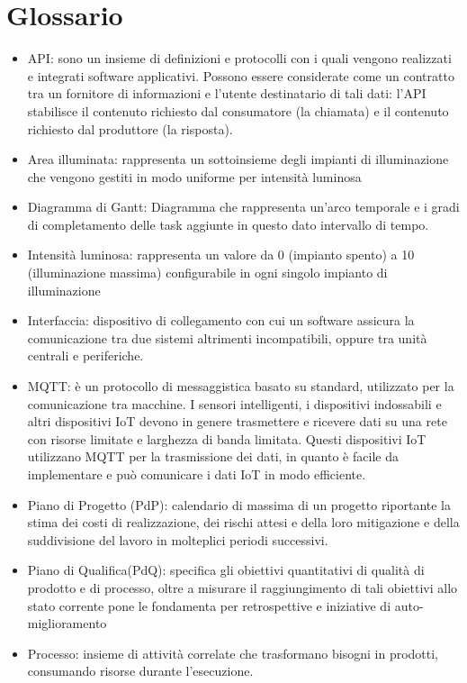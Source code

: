 \documentclass[12pt]{article}
\begin{document}
\section{Glossario}
\begin{itemize}
    \item API: sono un insieme di definizioni e protocolli con i quali vengono realizzati e integrati software applicativi. Possono essere considerate come un contratto tra un fornitore di informazioni e l'utente destinatario di tali dati: l'API stabilisce il contenuto richiesto dal consumatore (la chiamata) e il contenuto richiesto dal produttore (la risposta).
    \item Area illuminata: rappresenta un sottoinsieme degli impianti di illuminazione che vengono gestiti in modo uniforme per intensità luminosa
    \item Diagramma di Gantt: Diagramma che rappresenta un'arco temporale e i gradi di completamento delle task aggiunte in questo dato intervallo di tempo.
    \item Intensità luminosa: rappresenta un valore da 0 (impianto spento) a 10 (illuminazione massima) configurabile in ogni singolo impianto di illuminazione
    \item Interfaccia: dispositivo di collegamento con cui un software assicura la comunicazione tra due sistemi altrimenti incompatibili, oppure tra unità centrali e periferiche.
    \item MQTT: è un protocollo di messaggistica basato su standard, utilizzato per la comunicazione tra macchine. I sensori intelligenti, i dispositivi indossabili e altri dispositivi IoT devono in genere trasmettere e ricevere dati su una rete con risorse limitate e larghezza di banda limitata. Questi dispositivi IoT utilizzano MQTT per la trasmissione dei dati, in quanto è facile da implementare e può comunicare i dati IoT in modo efficiente.
    \item Piano di Progetto (PdP): calendario di massima di un progetto riportante la stima dei costi di realizzazione, dei rischi attesi e della loro mitigazione e della suddivisione del lavoro in molteplici periodi successivi. 
    \item Piano di Qualifica(PdQ): specifica gli obiettivi quantitativi di qualità di prodotto e di processo, oltre a misurare il raggiungimento di tali obiettivi allo stato corrente pone le fondamenta per retrospettive e iniziative di auto-miglioramento
    \item Processo: insieme di attività correlate che trasformano bisogni in prodotti, consumando risorse durante l'esecuzione.

\end{itemize}
\end{document}
